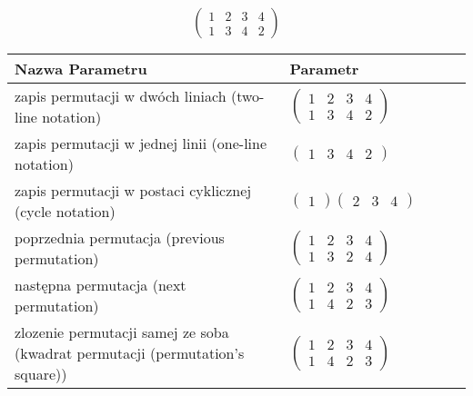 \documentclass[12pt]{article}
\begin{document}
\subsection{}
\begin{center}
\[
\begin{pmatrix}
	1 & 2 & 3 & 4 \\ 
	1 & 3 & 4 & 2 
\end{pmatrix}
\]

\begin{tabular}{|m{0.6\linewidth}|m{0.4\linewidth}|}
	\hline
	Nazwa Parametru & Parametr \\
	\hline
	zapis permutacji w dwóch liniach (two-line notation) & $\begin{pmatrix} 1 & 2 & 3 & 4 \\ 
1 & 3 & 4 & 2 \end{pmatrix}$ \\ 
	\hline
	zapis permutacji w jednej linii (one-line notation) & $\begin{pmatrix} 1 & 3 & 4 & 2 \end{pmatrix}$ \\ 
	\hline
	zapis permutacji w postaci cyklicznej (cycle notation) & $\begin{pmatrix} 1 \end{pmatrix} \begin{pmatrix} 2 & 3 & 4 \end{pmatrix} $ \\ 
	\hline
	poprzednia permutacja (previous permutation) & $\begin{pmatrix} 1 & 2 & 3 & 4 \\ 
1 & 3 & 2 & 4 \end{pmatrix}$ \\ 
	\hline
	następna permutacja (next permutation) & $\begin{pmatrix} 1 & 2 & 3 & 4 \\ 
1 & 4 & 2 & 3 \end{pmatrix}$ \\ 
	\hline
	zlozenie permutacji samej ze soba (kwadrat permutacji (permutation's square)) & $\begin{pmatrix} 1 & 2 & 3 & 4 \\ 
1 & 4 & 2 & 3 \end{pmatrix}$ \\ 
	\hline
\end{tabular}
\end{center}
\end{document}
